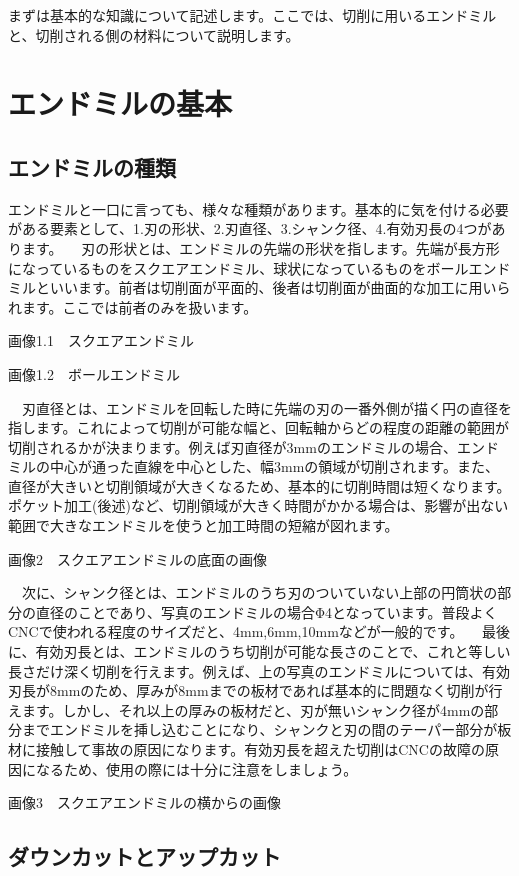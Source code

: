 \documentclass[onecolumn]{preport}
\begin{document}
まずは基本的な知識について記述します。ここでは、切削に用いるエンドミルと、切削される側の材料について説明します。

\section{エンドミルの基本}

\subsection{エンドミルの種類}

エンドミルと一口に言っても、様々な種類があります。基本的に気を付ける必要がある要素として、1.刃の形状、2.刃直径、3.シャンク径、4.有効刃長の4つがあります。
　刃の形状とは、エンドミルの先端の形状を指します。先端が長方形になっているものをスクエアエンドミル、球状になっているものをボールエンドミルといいます。前者は切削面が平面的、後者は切削面が曲面的な加工に用いられます。ここでは前者のみを扱います。

画像1.1　スクエアエンドミル

画像1.2　ボールエンドミル

　刃直径とは、エンドミルを回転した時に先端の刃の一番外側が描く円の直径を指します。これによって切削が可能な幅と、回転軸からどの程度の距離の範囲が切削されるかが決まります。例えば刃直径が3mmのエンドミルの場合、エンドミルの中心が通った直線を中心とした、幅3mmの領域が切削されます。また、直径が大きいと切削領域が大きくなるため、基本的に切削時間は短くなります。ポケット加工(後述)など、切削領域が大きく時間がかかる場合は、影響が出ない範囲で大きなエンドミルを使うと加工時間の短縮が図れます。

画像2　スクエアエンドミルの底面の画像

　次に、シャンク径とは、エンドミルのうち刃のついていない上部の円筒状の部分の直径のことであり、写真のエンドミルの場合Φ4となっています。普段よくCNCで使われる程度のサイズだと、4mm,6mm,10mmなどが一般的です。
　最後に、有効刃長とは、エンドミルのうち切削が可能な長さのことで、これと等しい長さだけ深く切削を行えます。例えば、上の写真のエンドミルについては、有効刃長が8mmのため、厚みが8mmまでの板材であれば基本的に問題なく切削が行えます。しかし、それ以上の厚みの板材だと、刃が無いシャンク径が4mmの部分までエンドミルを挿し込むことになり、シャンクと刃の間のテーパー部分が板材に接触して事故の原因になります。有効刃長を超えた切削はCNCの故障の原因になるため、使用の際には十分に注意をしましょう。

画像3　スクエアエンドミルの横からの画像

\subsection{ダウンカットとアップカット}
\end{document}
